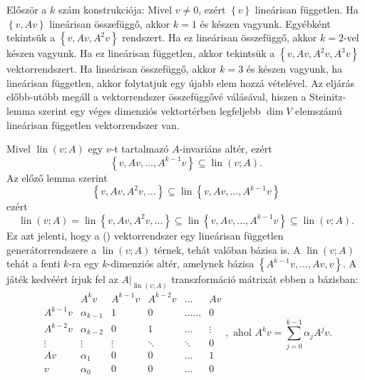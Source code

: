 \documentclass[9pt, a4paper, showtrims]{memoir}
\makeatletter
\renewenvironment{proof}[1][\proofname]
    {\par\pushQED{\qed}%
    \normalfont \topsep6\p@\@plus6\p@\relax
    \trivlist
    \item[\hskip\labelsep
        \itshape
    #1\@addpunct{:}]\ignorespaces}
    {\popQED\endtrivlist\@endpefalse}
\theoremstyle{plain}
\theoremstyle{remark}
\theoremstyle{definition}
\DeclareMathOperator{\lin}{lin}
\makeatother
\begin{document}
    \begin{proof}
        Először a $k$ szám konstrukciója:
        Mivel $v\neq 0$, ezért $\left\{ v \right\}$ lineárisan független.
        Ha $\left\{ v,Av \right\}$ lineárisan összefüggő,
        akkor $k=1$ és készen vagyunk.
        Egyébként tekintsük a $\left\{ v,Av,A^2v \right\}$ rendszert. 
        Ha ez lineárisan összefüggő, akkor $k=2$-vel készen vagyunk.
        Ha ez lineárisan független, akkor tekintsük a 
        $\left\{ v,Av,A^2v,A^3v \right\}$ vektorrendszert.
        Ha lineárisan összefüggő, akkor $k=3$ és készen vagyunk,
        ha lineárisan független, akkor folytatjuk egy újabb elem hozzá vételével.
        Az eljárás előbb-utóbb megáll a vektorrendszer összefüggővé válásával,
        hiszen a Steinitz-lemma  szerint egy véges dimenziós vektortérben legfeljebb
        $\dim V$ elemszámú lineárisan független vektorrendszer van.

        Mivel $\lin\left( v;A \right)$ egy $v$-t tartalmazó $A$-invariáns altér,
        ezért 
        \[
            \left\{ v,Av,\dots,A^{k-1}v \right\}
            \subseteq 
            \lin\left( v;A \right).
        \]
        Az előző lemma szerint
        \[
            \left\{ v,Av,A^2v,\dots \right\}
            \subseteq
            \lin\left\{ v,Av,\dots,A^{k-1}v \right\}
        \]
        ezért
        \[
            \lin\left( v;A \right)
            =
            \lin\left\{ v,Av,A^2v,\dots \right\}
            \subseteq
            \lin\left\{ v,Av,\dots,A^{k-1}v \right\}
            \subseteq
            \lin\left( v;A \right).
        \]
        Ez azt jelenti, hogy a (\dag) vektorrendszer egy lineárisan független generátorrendszere 
        a $\lin\left( v;A \right)$ térnek, tehát valóban bázisa is.
    \end{proof}
    A $\lin\left( v;A \right)$ tehát a fenti $k$-ra egy $k$-dimenziós altér,
    amelynek bázisa $\left\{A^{k-1}v,\dots,Av,v \right\}$.
    A játék kedvéért írjuk fel az $A|_{\lin\left( v;A \right)}$ transzformáció mátrixát 
    ebben a bázisban:
    \[
        \begin{array}{r|ccccc}
            &A^kv&A^{k-1}v&A^{k-2}v&\dots&Av\\
            \hline
            A^{k-1}v&\alpha_{k-1}&1&0&\dots\dots&0\\
            A^{k-2}v&\alpha_{k-2}&0& 1&\dots&\vdots\\
            \vdots  &\vdots      &\vdots&\ddots&\ddots&0\\
            Av&\alpha_1&0&0&\dots&1\\
            v&\alpha_0&0&0&\dots&0
        \end{array},
        \text{ ahol }A^kv=\sum_{j=0}^{k-1}\alpha_jA^jv.
    \]
\end{document}
